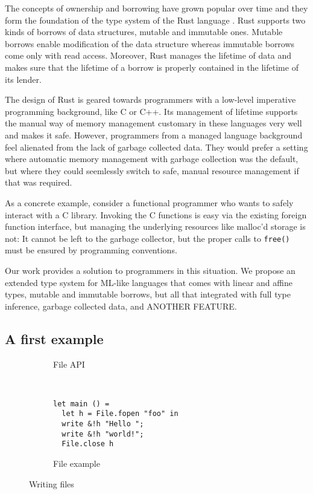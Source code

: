 The concepts of ownership and borrowing have grown popular over time
and they form the foundation of the type system of the Rust language
\cite{rust}. Rust supports two kinds of borrows of data structures, mutable and immutable
ones. Mutable borrows enable modification of the data structure
whereas immutable borrows come only with read access. Moreover, Rust
manages the lifetime of data and makes sure that the lifetime of a
borrow is properly contained in the lifetime of its lender. 

The design of Rust is geared towards programmers with a low-level
imperative programming background, like C or C++. Its management of
lifetime supports the manual way of memory management customary in
these languages very well and makes it safe. However, programmers from
a managed language background feel alienated from the lack of garbage
collected data. They would prefer a setting where automatic memory
management with garbage collection was the default, but where they
could seemlessly switch to safe, manual resource management if that
was required.

As a concrete example, consider a functional programmer who wants to
safely interact with a C library. Invoking the C functions is easy via
the existing foreign function interface, but managing the underlying
resources like malloc'd storage is not: It cannot be left to the
garbage collector, but the proper calls to \texttt{free()} must be
ensured by programming conventions.

Our work provides a solution to programmers in this situation. We
propose an extended type system for ML-like languages that comes with
linear and affine types, mutable and immutable borrows, but all that
integrated with full type inference, garbage collected data, and
ANOTHER FEATURE.

\subsection{A first example}
\label{sec:first-example}
\begin{figure}[tp]
  \begin{subfigure}[t]{0.45\linewidth}
    
    \caption{File API}
    \label{fig:writing-files-api}
  \end{subfigure}
  ~
  \begin{subfigure}[t]{0.45\linewidth}
\begin{lstlisting}
let main () =
  let h = File.fopen "foo" in
  write &!h "Hello ";
  write &!h "world!";
  File.close h
\end{lstlisting}
    \caption{File example}
    \label{fig:writing-files-example}
  \end{subfigure}
  \caption{Writing files}
  \label{fig:writing-fiules}
\end{figure}

